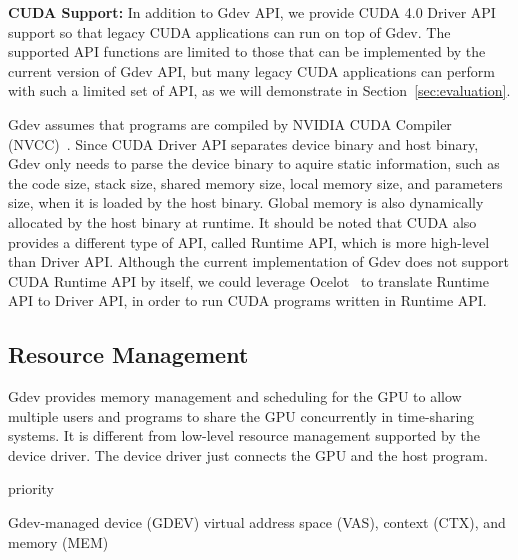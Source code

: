 \textbf{CUDA Support:}
In addition to Gdev API, we provide CUDA 4.0 Driver API~\cite{CUDA40}
support so that legacy CUDA applications can run on top of Gdev.
The supported API functions are limited to those that can be implemented
by the current version of Gdev API, but many legacy CUDA applications
can perform with such a limited set of API, as we will demonstrate in
Section~\ref{sec:evaluation}.

Gdev assumes that programs are compiled by NVIDIA CUDA Compiler
(NVCC)~\cite{CUDA40}.
Since CUDA Driver API separates device binary and host binary, Gdev only
needs to parse the device binary to aquire static information, such
as the code size, stack size, shared memory size, local memory size, and
parameters size, when it is loaded by the host binary.
Global memory is also dynamically allocated by the host binary at
runtime.
It should be noted that CUDA also provides a different type of API,
called Runtime API, which is more high-level than Driver API.
Although the current implementation of Gdev does not support CUDA
Runtime API by itself, we could leverage Ocelot~\cite{Diamos_PACT10} to
translate Runtime API to Driver API, in order to run CUDA programs
written in Runtime API.

\subsection{Resource Management}

Gdev provides memory management and scheduling for the GPU to allow
multiple users and programs to share the GPU concurrently in
time-sharing systems.
It is different from low-level resource management supported by the
device driver.
The device driver just connects the GPU and the host program.

priority

Gdev-managed device (GDEV) virtual address space (VAS), context (CTX),
and memory (MEM)